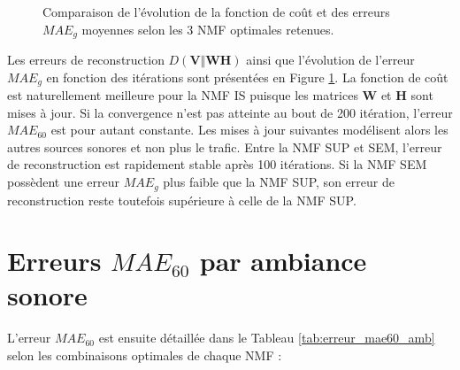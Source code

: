 \begin{figure}[h!]
\centering
{}%
\qquad
{}%
\caption{Comparaison de l'évolution de la fonction de coût et des erreurs $MAE_g$ moyennes selon les 3 NMF optimales retenues.}
\label{fig:evolution_mae}
\end{figure}

Les erreurs de reconstruction $D(\mathbf{V} \Vert \mathbf{WH})$ ainsi que l'évolution de l'erreur $MAE_g$ en fonction des itérations sont présentées en Figure \ref{fig:evolution_mae}. La fonction de coût est naturellement meilleure pour la NMF IS puisque les matrices $\mathbf{W}$ et $\mathbf{H}$ sont mises à jour. Si la convergence n'est pas atteinte au bout de 200 itération, l'erreur $MAE_{60}$ est pour autant constante. Les mises à jour suivantes modélisent alors les autres sources sonores et non plus le trafic.
Entre la NMF SUP et SEM, l'erreur de reconstruction est rapidement stable après 100 itérations. Si la NMF SEM possèdent une erreur $MAE_g$ plus faible que la NMF SUP, son erreur de reconstruction reste toutefois supérieure à celle de la NMF SUP. 


\section{Erreurs $MAE_{60}$ par ambiance sonore}

L'erreur $MAE_{60}$ est ensuite détaillée dans le Tableau \ref{tab:erreur_mae60_amb} selon les combinaisons optimales de chaque NMF : 

